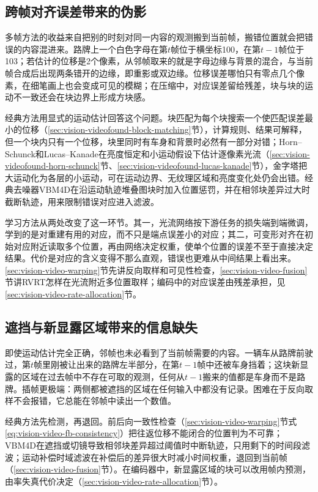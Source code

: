 \subsection{跨帧对齐误差带来的伪影}
\label{sec:vision-video-challenge-alignment}

多帧方法的收益来自把别的时刻对同一内容的观测搬到当前帧，搬错位置就会把错误的内容混进来。路牌上一个白色字母在第$t$帧位于横坐标100，在第$t-1$帧位于103；若估计的位移是2个像素，从邻帧取来的就是字母边缘与背景的混合，与当前帧合成后出现两条错开的边缘，即重影或双边缘。位移误差哪怕只有零点几个像素，在细笔画上也会变成可见的模糊；在压缩中，对应误差留给残差，块与块的运动不一致还会在块边界上形成方块感。

经典方法用显式的运动估计回答这个问题。块匹配为每个块搜索一个使匹配误差最小的位移（\ref{sec:vision-videofound-block-matching}节），计算规则、结果可解释，但一个块内只有一个位移，块里同时有车身和背景时必然有一部分对错；Horn--Schunck和Lucas--Kanade在亮度恒定和小运动假设下估计逐像素光流（\ref{sec:vision-videofound-horn-schunck}节、\ref{sec:vision-videofound-lucas-kanade}节），金字塔把大运动化为各层的小运动，可在运动边界、无纹理区域和亮度变化处仍会出错。经典去噪器VBM4D在沿运动轨迹堆叠图块时加入位置惩罚，并在相邻块差异过大时截断轨迹，用来限制错误对应进入滤波。

学习方法从两处改变了这一环节。其一，光流网络按下游任务的损失端到端微调，学到的是对重建有用的对应，而不只是端点误差小的对应；其二，可变形对齐在初始对应附近读取多个位置，再由网络决定权重，使单个位置的误差不至于直接决定结果。代价是对应的含义变得不那么直观，错误也更难从中间结果上看出来。\ref{sec:vision-video-warping}节先讲反向取样和可见性检查，\ref{sec:vision-video-fusion}节讲RVRT怎样在光流附近多位置取样；编码中的对应误差由残差承担，见\ref{sec:vision-video-rate-allocation}节。

\subsection{遮挡与新显露区域带来的信息缺失}
\label{sec:vision-video-challenge-occlusion}

即使运动估计完全正确，邻帧也未必看到了当前帧需要的内容。一辆车从路牌前驶过，第$t$帧里刚被让出来的路牌左半部分，在第$t-1$帧中还被车身挡着；这块新显露的区域在过去帧中不存在可取的观测，任何从$t-1$搬来的值都是车身而不是路牌。插帧更极端：两侧都被遮挡的区域在任何输入中都没有记录。困难在于反向取样不会报错，它总能在邻帧中读出一个数值。

经典方法先检测，再退回。前后向一致性检查（\ref{sec:vision-video-warping}节式\eqref{eq:vision-video-fb-consistency}）把往返位移不能闭合的位置判为不可靠；VBM4D在遮挡或切镜导致相邻块差异超过阈值时中断轨迹，只用剩下的时间段滤波；运动补偿时域滤波在补偿后的差异很大时减小时间权重，退回到当前帧（\ref{sec:vision-video-fusion}节）。在编码器中，新显露区域的块可以改用帧内预测，由率失真代价决定（\ref{sec:vision-video-rate-allocation}节）。

